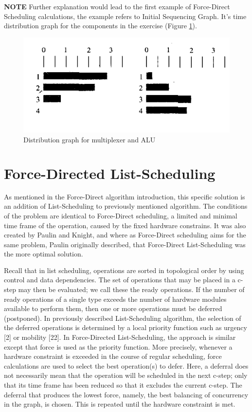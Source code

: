 \documentclass[conference]{IEEEtran}
\begin{document}
\textbf{NOTE} Further explanation would lead to the first example of Force-Direct Scheduling calculations, the example refers to Initial Sequencing Graph. It's time distribution graph for the components in the exercise (Figure \ref{fdexample}).

\begin{figure}[htbp]
\centerline{\includegraphics[scale=.5]{Example5.4.10.png}}
\caption{Distribution graph for multiplexer and ALU}
\label{fdexample}
\end{figure}

\section{Force-Directed List-Scheduling}

As mentioned in the Force-Direct algorithm introduction, this specific solution is an addition of List-Scheduling to previously mentioned algorithm. The conditions of the problem are identical to Force-Direct scheduling, a limited and minimal time frame of the operation, caused by the fixed hardware constrains. It was also created by Paulin and Knight, and where as Force-Direct scheduling aims for the same problem, Paulin originally described, that Force-Direct List-Scheduling was the more optimal solution.

Recall that in list scheduling, operations are sorted in topological order by using control and data dependencies. The set of operations that may be placed in a c-step may then be evaluated; we call these the ready operations. If the number of ready operations of a single type exceeds the number of hardware modules available to perform them, then one or more operations must be deferred (postponed). In previously described List-Scheduling algorithm, the selection of the deferred operations is determined by a local priority function such as urgency [2] or mobility [22]. In Force-Directed List-Scheduling, the approach is similar except that force is used as the priority function. More precisely, whenever a hardware constraint is exceeded in the course of regular scheduling, force calculations are used to select the best operation(s) to defer. Here, a deferral does not necessarily mean that the operation will be scheduled in the next c-step; only that its time frame has been reduced so that it excludes the current c-step. The deferral that produces the lowest force, namely, the best balancing of concurrency in the graph, is chosen. This is repeated until the hardware constraint is met.
\end{document}
